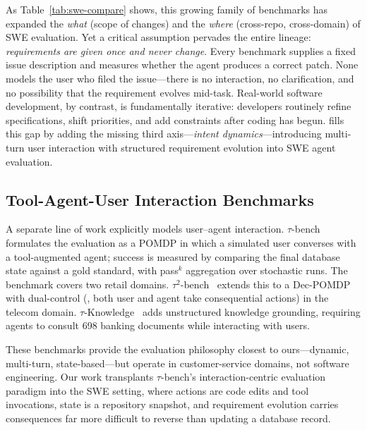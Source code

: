 As Table~\ref{tab:swe-compare} shows, this growing family of benchmarks has expanded the \emph{what} (scope of changes) and the \emph{where} (cross-repo, cross-domain) of SWE evaluation. Yet a critical assumption pervades the entire lineage: \emph{requirements are given once and never change}. Every benchmark supplies a fixed issue description and measures whether the agent produces a correct patch. None models the user who filed the issue---there is no interaction, no clarification, and no possibility that the requirement evolves mid-task. Real-world software development, by contrast, is fundamentally iterative: developers routinely refine specifications, shift priorities, and add constraints after coding has begun. \bench{} fills this gap by adding the missing third axis---\emph{intent dynamics}---introducing multi-turn user interaction with structured requirement evolution into SWE agent evaluation.

\subsection{Tool-Agent-User Interaction Benchmarks}
\label{sec:rw-interaction}

A separate line of work explicitly models user--agent interaction. $\tau$-bench~\citep{yao2024taubench} formulates the evaluation as a POMDP in which a simulated user converses with a tool-augmented agent; success is measured by comparing the final database state against a gold standard, with pass$^k$ aggregation over stochastic runs. The benchmark covers two retail domains. $\tau^2$-bench~\citep{tau2bench2025} extends this to a Dec-POMDP with dual-control (\ie, both user and agent take consequential actions) in the telecom domain. $\tau$-Knowledge~\citep{tauknowledge2026} adds unstructured knowledge grounding, requiring agents to consult 698 banking documents while interacting with users.

These benchmarks provide the evaluation philosophy closest to ours---dynamic, multi-turn, state-based---but operate in customer-service domains, not software engineering. Our work transplants $\tau$-bench's interaction-centric evaluation paradigm into the SWE setting, where actions are code edits and tool invocations, state is a repository snapshot, and requirement evolution carries consequences far more difficult to reverse than updating a database record.

